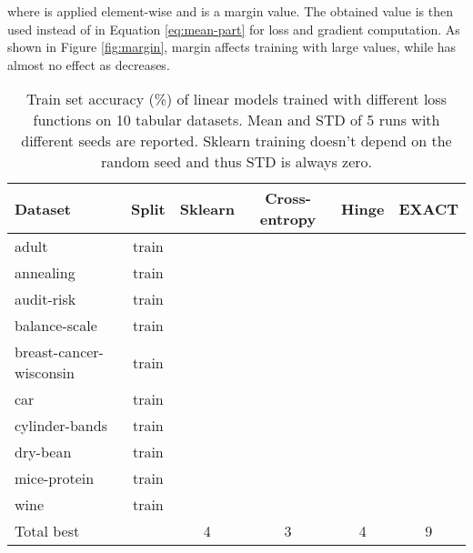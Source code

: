 \documentclass[nohyperref]{article}
\theoremstyle{plain}
\theoremstyle{definition}
\theoremstyle{remark}
\begin{document}
where  is applied element-wise and  is a margin value. The obtained  value is then used instead of  in Equation \ref{eq:mean-part} for loss and gradient computation. As shown in Figure \ref{fig:margin}, margin affects training with large  values, while has almost no effect as  decreases.
\begin{table*}[t]
\centering
\begin{tabular}{lc|cccc}
Dataset & Split & Sklearn & Cross-entropy & Hinge & EXACT \\
\hline

adult                   & train &  &  &  &  \\
annealing               & train &  &  &  &  \\
audit-risk              & train &  &  &  &  \\
balance-scale           & train &  &  &  &  \\
breast-cancer-wisconsin & train &  &  &  &  \\
car                     & train &  &  &  &  \\
cylinder-bands          & train &  &  &  &  \\
dry-bean                & train &  &  &  &  \\
mice-protein            & train &  &  &  &  \\
wine                    & train &  &  &  &  \\
\hline
Total best & & 4 & 3 & 4 & 9 \\



\end{tabular}
\vskip 0.2in

\caption{Train set accuracy (\%) of linear models trained with different loss functions on 10 tabular datasets. Mean and STD of 5 runs with different seeds are reported. Sklearn training doesn't depend on the random seed and thus STD is always zero.}
\label{tab:uci-train}
\end{table*}
\end{document}
